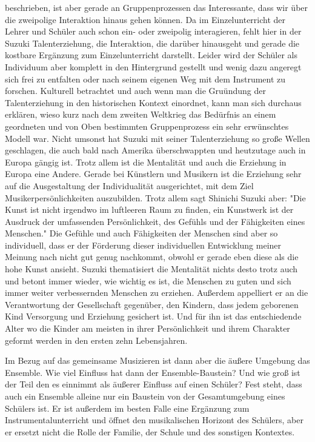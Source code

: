 beschrieben, ist aber gerade an Gruppenprozessen das Interessante, dass wir über
die zweipolige Interaktion hinaus gehen können. Da im Einzelunterricht der
Lehrer und Schüler auch schon ein- oder zweipolig interagieren, fehlt hier in
der Suzuki Talenterziehung, die Interaktion, die darüber hinausgeht und gerade
die kostbare Ergänzung zum Einzelunterricht darstellt. Leider wird der Schüler
als Individuum aber komplett in den Hintergrund gestellt und wenig dazu angeregt
sich frei zu entfalten oder nach seinem eigenen Weg mit dem Instrument zu
forschen. Kulturell betrachtet und auch wenn man die Gruündung der
Talenterziehung in den historischen Kontext einordnet, kann man sich durchaus
erklären, wieso kurz nach dem zweiten Weltkrieg das Bedürfnis an einem
geordneten und von Oben bestimmten Gruppenprozess ein sehr erwünschtes Modell
war. Nicht umsonst hat Suzuki mit seiner Talenterziehung so große Wellen
geschlagen, die auch bald nach Amerika überschwappten und heutzutage auch in
Europa gängig ist. Trotz allem ist die Mentalität und auch die Erziehung in
Europa eine Andere. Gerade bei Künstlern und Musikern ist die Erziehung sehr auf
die Ausgestaltung der Individualität ausgerichtet, mit dem Ziel
Musikerpersönlichkeiten auszubilden. Trotz allem sagt Shinichi Suzuki aber: "Die
Kunst ist nicht irgendwo im luftleeren Raum zu finden, ein Kunstwerk ist der
Ausdruck der umfassenden Persönlichkeit, des Gefühls und der Fähigkeiten eines
Menschen." \autocite[103]{suzuki:erziehung_ist_liebe} Die Gefühle und auch
Fähigkeiten der Menschen sind aber so individuell, dass er der Förderung dieser
individuellen Entwicklung meiner Meinung nach nicht gut genug nachkommt, obwohl
er gerade eben diese als die hohe Kunst ansieht. Suzuki thematisiert die
Mentalität nichts desto trotz auch und betont immer wieder, wie wichtig es ist,
die Menschen zu guten und sich immer weiter verbessernden Menschen zu erziehen.
Außerdem appelliert er an die Verantwortung der Gesellschaft gegenüber, den
Kindern, dass jedem geborenen Kind Versorgung und Erziehung gesichert ist.
\autocite[130]{suzuki:erziehung_ist_liebe} Und für ihn ist das entschiedende
Alter wo die Kinder am meisten in ihrer Persönlichkeit und ihrem Charakter
geformt werden in den ersten zehn Lebensjahren. 


Im Bezug auf das gemeinsame Musizieren ist dann aber die äußere Umgebung das
Ensemble. Wie viel Einfluss hat dann der Ensemble-Baustein? Und wie groß ist der
Teil den es einnimmt als äußerer Einfluss auf einen Schüler? Fest steht, dass
auch ein Ensemble alleine nur ein Baustein von der Gesamtumgebung eines Schülers
ist. Er ist außerdem im besten Falle eine Ergänzung zum Instrumentalunterricht
und öffnet den musikalischen Horizont des Schülers, aber er ersetzt nicht die
Rolle der Familie, der Schule und des sonstigen Kontextes. 






